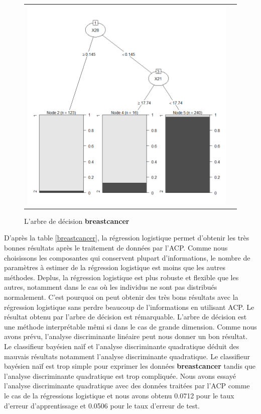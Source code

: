 \documentclass[a4paper,11pt,oneside,roman]{article}
\begin{document}
\begin{figure}[htb]
    \centering
    \begin{tabular}{cc}
    \includegraphics[scale = .4]{./discrimination/breastcancer/tree.png} &
    \end{tabular}
    \caption{L'arbre de décision \textbf{breastcancer}}
    \label{fig:my_label}
\end{figure}
\newline
D'après la table \ref{breastcancer}, la régression logistique permet d'obtenir les très bonnes résultats après le traitement de données par l'ACP. Comme nous choisissons les composantes qui conservent plupart d'informations, le nombre de paramètres à estimer de la régression logistique est moins que les autres méthodes. Deplus, la régression logistique est plus robuste et flexible que les autres, notamment dans le cas où les individus ne sont pas distribués normalement. C'est pourquoi on peut obtenir des très bons résultats avec la régression logistique sans perdre beaucoup de l'informations en utilisant ACP. Le résultat obtenu par l'arbre de décision est rémarquable. L'arbre de décision est une méthode interprétable mêmi si dans le cas de grande dimension. Comme nous avons prévu, l'analyse discriminante linéaire peut nous donner un bon résultat. Le classifieur bayésien naïf et l'analyse discriminante quadratique déduit des mauvais résultats notamment l'analyse discriminante quadratique. Le classifieur bayésien naïf est trop simple pour exprimer les données \textbf{breastcancer} tandis que l'analyse discriminante quadratique est trop compliquée. Nous avons essayé l'analyse discriminante quadratique avec des données traitées par l'ACP comme le cas de la régressions logistique et nous avons obtenu 0.0712 pour le taux d'erreur d'apprentissage et 0.0506 pour le taux d'erreur de test. 
\end{document}
